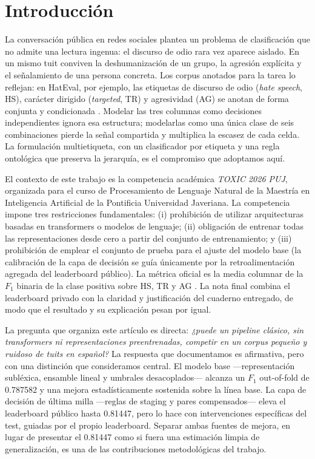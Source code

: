 \section{Introducción}
\label{sec:introduccion}

La conversación pública en redes sociales plantea un problema de clasificación
que no admite una lectura ingenua: el discurso de odio rara vez aparece
aislado. En un mismo tuit conviven la deshumanización de un grupo, la
agresión explícita y el señalamiento de una persona concreta. Los corpus
anotados para la tarea lo reflejan: en HatEval, por ejemplo, las etiquetas de
discurso de odio (\emph{hate speech}, HS), carácter dirigido (\emph{targeted},
TR) y agresividad (AG) se anotan de forma conjunta y condicionada
\cite{basile2019hateval}. Modelar las tres columnas como decisiones
independientes ignora esa estructura; modelarlas como una única clase de seis
combinaciones pierde la señal compartida y multiplica la escasez de cada
celda. La formulación multietiqueta, con un clasificador por etiqueta y una
regla ontológica que preserva la jerarquía, es el compromiso que adoptamos
aquí.

El contexto de este trabajo es la competencia académica \emph{TOXIC 2026 PUJ},
organizada para el curso de Procesamiento de Lenguaje Natural de la Maestría
en Inteligencia Artificial de la Pontificia Universidad Javeriana. La
competencia impone tres restricciones fundamentales: (i) prohibición de
utilizar arquitecturas basadas en transformers o modelos de lenguaje; (ii)
obligación de entrenar todas las representaciones desde cero a partir del
conjunto de entrenamiento; y (iii) prohibición de emplear el conjunto de
prueba para el ajuste del modelo base (la calibración de la capa de decisión
se guía únicamente por la retroalimentación agregada del leaderboard público). La métrica oficial es la media columnar de la $F_1$ binaria
de la clase positiva sobre HS, TR y AG \cite{opitz2019macro}. La nota final
combina el leaderboard privado con la claridad y justificación del cuaderno
entregado, de modo que el resultado y su explicación pesan por igual.

La pregunta que organiza este artículo es directa: \emph{¿puede un pipeline
clásico, sin transformers ni representaciones preentrenadas, competir en un
corpus pequeño y ruidoso de tuits en español?} La respuesta que documentamos
es afirmativa, pero con una distinción que consideramos central. El modelo
base ---representación subléxica, ensamble lineal y umbrales desacoplados---
alcanza un $F_1$ out-of-fold de 0.787582 y una mejora estadísticamente
sostenida sobre la línea base. La capa de decisión de última milla ---reglas
de staging y pares compensados--- eleva el leaderboard público hasta 0.81447,
pero lo hace con intervenciones específicas del test, guiadas por el propio
leaderboard. Separar ambas fuentes de mejora, en lugar de presentar el
0.81447 como si fuera una estimación limpia de generalización, es una de las
contribuciones metodológicas del trabajo.

